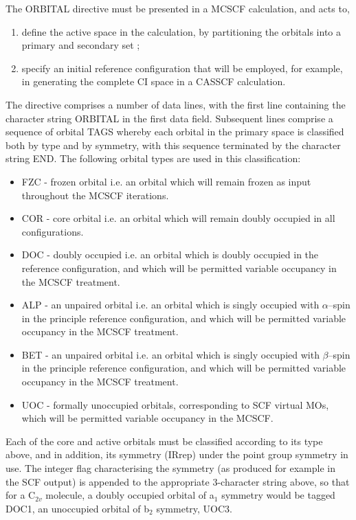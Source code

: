 \documentclass[11pt,fleqn]{article}
\begin{document}
The ORBITAL directive must be presented in a MCSCF calculation, 
and acts to,
\begin{enumerate}
\item  define the active space in the  calculation, by partitioning
the orbitals into a primary and secondary set  \cite{roos};
\item  specify an initial reference configuration 
that will be employed, for example, in
generating the complete CI space in a CASSCF calculation.
\end{enumerate}
The directive comprises a number of data lines, with the first line
containing the character string ORBITAL in the first data field.
Subsequent lines comprise
a sequence of orbital TAGS whereby each orbital
in the primary space is classified both by type  and by symmetry, 
with this sequence terminated by the character string END.
The following orbital types are used in this
classification:
\begin{itemize}
\item  FZC - frozen orbital i.e. an orbital which will remain
frozen as input throughout the MCSCF iterations.
\item  COR - core orbital i.e. an orbital which will remain
doubly occupied in all configurations.
\item DOC - doubly occupied i.e. an orbital which is doubly occupied in
the reference configuration, and which  will be permitted
variable occupancy in the MCSCF treatment.
\item  ALP - an unpaired orbital i.e. an orbital which 
is singly occupied with $\alpha$--spin
in the principle reference configuration, and which will be permitted
variable occupancy in the MCSCF treatment.
\item  BET - an unpaired orbital i.e. an orbital which 
is singly occupied with $\beta$--spin
in the principle reference configuration, and which will be permitted
variable occupancy in the MCSCF treatment.
\item UOC - formally unoccupied orbitals, corresponding to SCF virtual
MOs, which will be permitted variable occupancy in the MCSCF.
\end{itemize}
Each of the core and active orbitals must be classified according
to its type above, and in addition, its symmetry 
(IRrep) under the point group symmetry in use. The integer flag
characterising the symmetry (as produced for example in the
SCF output) is appended to the appropriate 3-character string
above, so that for a C$_{2v}$ molecule, a doubly occupied
orbital of a$_{1}$ symmetry would be tagged DOC1, an unoccupied
orbital of b$_{2}$ symmetry, UOC3.
\end{document}
